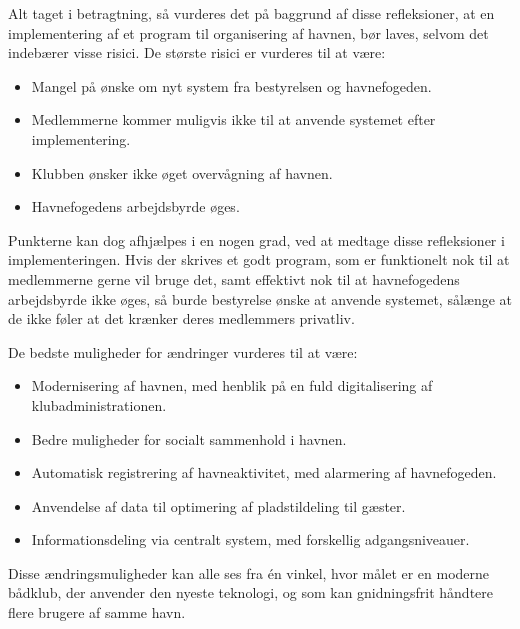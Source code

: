 Alt taget i betragtning, så vurderes det på baggrund af disse refleksioner, at en implementering af et program til organisering af havnen, bør laves, selvom det indebærer visse risici. De største risici er vurderes til at være:

\begin{itemize}
  \item Mangel på ønske om nyt system fra bestyrelsen og havnefogeden.
  \item Medlemmerne kommer muligvis ikke til at anvende systemet efter implementering.
  \item Klubben ønsker ikke øget overvågning af havnen.
  \item Havnefogedens arbejdsbyrde øges.
\end{itemize}

Punkterne kan dog afhjælpes i en nogen grad, ved at medtage disse refleksioner i implementeringen. Hvis der skrives et godt program, som er funktionelt nok til at medlemmerne gerne vil bruge det, samt effektivt nok til at havnefogedens arbejdsbyrde ikke øges, så burde bestyrelse ønske at anvende systemet, sålænge at de ikke føler at det krænker deres medlemmers privatliv.

De bedste muligheder for ændringer vurderes til at være:

\begin{itemize}
  \item Modernisering af havnen, med henblik på en fuld digitalisering af klubadministrationen.
  \item Bedre muligheder for socialt sammenhold i havnen.
  \item Automatisk registrering af havneaktivitet, med alarmering af havnefogeden.
  \item Anvendelse af data til optimering af pladstildeling til gæster.
  \item Informationsdeling via centralt system, med forskellig adgangsniveauer.
\end{itemize}

Disse ændringsmuligheder kan alle ses fra én vinkel, hvor målet er en moderne bådklub, der anvender den nyeste teknologi, og som kan gnidningsfrit håndtere flere brugere af samme havn.
